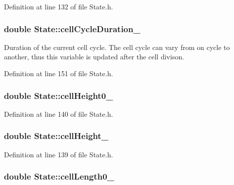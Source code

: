 \-Definition at line 132 of file \-State.\-h.

\hypertarget{class_state_ac8cc11c0aa1e35e7dcef4a8bd4582a2b}{
\subsubsection[{cell\-Cycle\-Duration\-\_\-}]{\setlength{\rightskip}{0pt plus 5cm}double {\bf \-State\-::cell\-Cycle\-Duration\-\_\-}}}\label{class_state_ac8cc11c0aa1e35e7dcef4a8bd4582a2b}
\-Duration of the current cell cycle. \-The cell cycle can vary from on cycle to another, thus this variable is updated after the cell divison. 

\-Definition at line 151 of file \-State.\-h.

\hypertarget{class_state_a23f54bcf077dfed8d98ce8325f47d07e}{
\subsubsection[{cell\-Height0\-\_\-}]{\setlength{\rightskip}{0pt plus 5cm}double {\bf \-State\-::cell\-Height0\-\_\-}}}\label{class_state_a23f54bcf077dfed8d98ce8325f47d07e}


\-Definition at line 140 of file \-State.\-h.

\hypertarget{class_state_a8ffa6fbc7b121992d5d7d5dbef3ffce4}{
\subsubsection[{cell\-Height\-\_\-}]{\setlength{\rightskip}{0pt plus 5cm}double {\bf \-State\-::cell\-Height\-\_\-}}}\label{class_state_a8ffa6fbc7b121992d5d7d5dbef3ffce4}


\-Definition at line 139 of file \-State.\-h.

\hypertarget{class_state_a994d5634f7c1440f2db9b4c0df381584}{
\subsubsection[{cell\-Length0\-\_\-}]{\setlength{\rightskip}{0pt plus 5cm}double {\bf \-State\-::cell\-Length0\-\_\-}}}\label{class_state_a994d5634f7c1440f2db9b4c0df381584}


